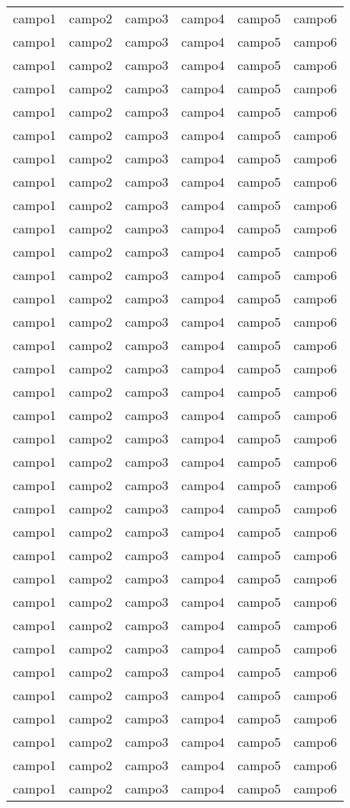 \begin{longtable}[c]{c|c|c|c|c|c}
	campo1 & campo2 & campo3 & campo4 & campo5 & campo6 \\
	campo1 & campo2 & campo3 & campo4 & campo5 & campo6 \\
	campo1 & campo2 & campo3 & campo4 & campo5 & campo6 \\
	campo1 & campo2 & campo3 & campo4 & campo5 & campo6 \\
	campo1 & campo2 & campo3 & campo4 & campo5 & campo6 \\
	campo1 & campo2 & campo3 & campo4 & campo5 & campo6 \\
	campo1 & campo2 & campo3 & campo4 & campo5 & campo6 \\
	campo1 & campo2 & campo3 & campo4 & campo5 & campo6 \\
	campo1 & campo2 & campo3 & campo4 & campo5 & campo6 \\
	campo1 & campo2 & campo3 & campo4 & campo5 & campo6 \\
	campo1 & campo2 & campo3 & campo4 & campo5 & campo6 \\
	campo1 & campo2 & campo3 & campo4 & campo5 & campo6 \\
	campo1 & campo2 & campo3 & campo4 & campo5 & campo6 \\
	campo1 & campo2 & campo3 & campo4 & campo5 & campo6 \\
	campo1 & campo2 & campo3 & campo4 & campo5 & campo6 \\
	campo1 & campo2 & campo3 & campo4 & campo5 & campo6 \\
	campo1 & campo2 & campo3 & campo4 & campo5 & campo6 \\
	campo1 & campo2 & campo3 & campo4 & campo5 & campo6 \\
	campo1 & campo2 & campo3 & campo4 & campo5 & campo6 \\
	campo1 & campo2 & campo3 & campo4 & campo5 & campo6 \\
	campo1 & campo2 & campo3 & campo4 & campo5 & campo6 \\
	campo1 & campo2 & campo3 & campo4 & campo5 & campo6 \\
	campo1 & campo2 & campo3 & campo4 & campo5 & campo6 \\
	campo1 & campo2 & campo3 & campo4 & campo5 & campo6 \\
	campo1 & campo2 & campo3 & campo4 & campo5 & campo6 \\
	campo1 & campo2 & campo3 & campo4 & campo5 & campo6 \\
	campo1 & campo2 & campo3 & campo4 & campo5 & campo6 \\
	campo1 & campo2 & campo3 & campo4 & campo5 & campo6 \\
	campo1 & campo2 & campo3 & campo4 & campo5 & campo6 \\
	campo1 & campo2 & campo3 & campo4 & campo5 & campo6 \\
	campo1 & campo2 & campo3 & campo4 & campo5 & campo6 \\
	campo1 & campo2 & campo3 & campo4 & campo5 & campo6 \\
	campo1 & campo2 & campo3 & campo4 & campo5 & campo6 \\
	campo1 & campo2 & campo3 & campo4 & campo5 & campo6 \\
	

\end{longtable}
